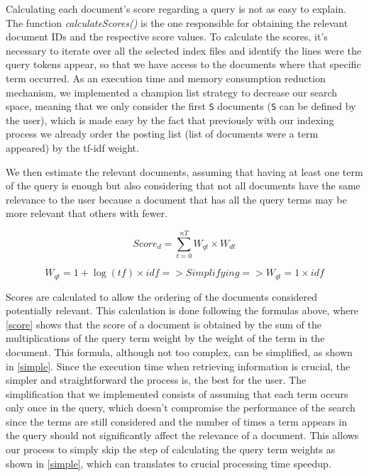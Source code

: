 \documentclass[12pt]{article}
\begin{document}
Calculating each document's score regarding a query is not as easy to explain. 
The function \textit{calculateScores()} is the one responsible for obtaining the 
relevant document IDs and the respective score values. 
To calculate the scores, it's necessary to iterate over all the selected index 
files and identify the lines were the query tokens appear, so that we have access 
to the documents where that specific term occurred.
As an execution time and memory consumption reduction mechanism, we implemented 
a champion list strategy to decrease our search space, meaning that we only 
consider the first \texttt{S} documents (\texttt{S} can be defined by the user), 
which is made easy by the fact that previously with our indexing process we 
already order the posting list (list of documents were a term appeared) by the 
tf-idf weight.

We then estimate the relevant documents, assuming that having at least one term 
of the query is enough but also considering that not all documents have the same 
relevance to the user because a document that has all the query terms may be more 
relevant that others with fewer.

\begin{equation}
  \label{score}
  Score_{d} = \sum_{t=0}^{nT} W_{qt} \times W_{dt}
\end{equation}

\begin{equation}
  \label{simple}
  W_{qt} = 1 + \log(tf) \times idf => Simplifying => W_{qt} = 1 \times idf
\end{equation}

Scores are calculated to allow the ordering of the documents considered potentially
relevant. This calculation is done following the formulas above, where \ref{score} 
shows that the score of a document is obtained by the sum of the multiplications 
of the query term weight by the weight of the term in the document. 
This formula, although not too complex, can be simplified, as shown in \ref{simple}. 
Since the execution time when retrieving information is crucial, the simpler and 
straightforward the process is, the best for the user. 
The simplification that we implemented consists of assuming that each term occurs 
only once in the query, which doesn't compromise the performance of the search 
since the terms are still considered and the number of times a term appears in 
the query should not significantly affect the relevance of a document. 
This allows our process to simply skip the step of calculating the query term 
weights as shown in \ref{simple}, which can translates to crucial processing time speedup.
\end{document}
